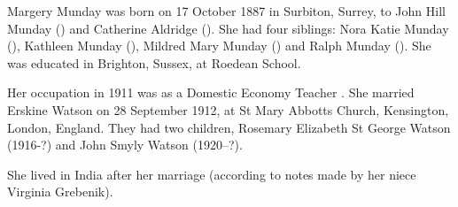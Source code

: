 
Margery Munday was born on 17 October 1887 in	Surbiton, Surrey, to John Hill Munday () and Catherine Aldridge (). She had four siblings: Nora Katie Munday (), Kathleen Munday (), Mildred Mary Munday () and Ralph Munday ().
She was educated in Brighton, Sussex, at Roedean School.

Her occupation in 1911 was as a Domestic Economy Teacher \cite{MMundayOccupation}.
She married Erskine Watson on 28 September 1912, at St Mary Abbotts Church, Kensington, London, England.  They had two children, Rosemary Elizabeth St George Watson (1916-?) and John Smyly Watson (1920--?).

She lived in India after her marriage (according to notes made by her niece Virginia Grebenik).



